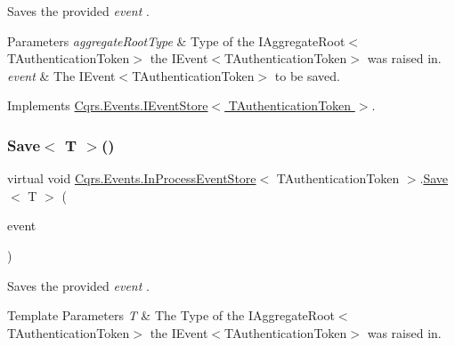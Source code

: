 Saves the provided {\itshape event} . 


\begin{DoxyParams}{Parameters}
{\em aggregate\+Root\+Type} & Type of the I\+Aggregate\+Root$<$\+T\+Authentication\+Token$>$ the I\+Event$<$\+T\+Authentication\+Token$>$ was raised in.\\
\hline
{\em event} & The I\+Event$<$\+T\+Authentication\+Token$>$ to be saved.\\
\hline
\end{DoxyParams}


Implements \hyperlink{interfaceCqrs_1_1Events_1_1IEventStore_a81fb586703e7c6dea6b23d9a95f3887a_a81fb586703e7c6dea6b23d9a95f3887a}{Cqrs.\+Events.\+I\+Event\+Store$<$ T\+Authentication\+Token $>$}.

\mbox{\label{classCqrs_1_1Events_1_1InProcessEventStore_a72dbd170c7e89e1a7bd313d2b3900c64_a72dbd170c7e89e1a7bd313d2b3900c64}} 
\subsubsection{\texorpdfstring{Save$<$ T $>$()}{Save< T >()}}
{\footnotesize\ttfamily virtual void \hyperlink{classCqrs_1_1Events_1_1InProcessEventStore}{Cqrs.\+Events.\+In\+Process\+Event\+Store}$<$ T\+Authentication\+Token $>$.\hyperlink{classCqrs_1_1Events_1_1InProcessEventStore_ad9ddcf747084d8173bd703a6dd1b5041_ad9ddcf747084d8173bd703a6dd1b5041}{Save}$<$ T $>$ (\begin{DoxyParamCaption}\item[{\hyperlink{interfaceCqrs_1_1Events_1_1IEvent}{I\+Event}$<$ T\+Authentication\+Token $>$ @}]{event }\end{DoxyParamCaption})\hspace{0.3cm}{\ttfamily [virtual]}}



Saves the provided {\itshape event} . 


\begin{DoxyTemplParams}{Template Parameters}
{\em T} & The Type of the I\+Aggregate\+Root$<$\+T\+Authentication\+Token$>$ the I\+Event$<$\+T\+Authentication\+Token$>$ was raised in.\\
\hline
\end{DoxyTemplParams}

